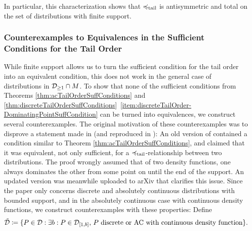 \documentclass[a4paper,DIV=11,abstracton,twoside=semi]{scrreprt}
\newcommand{\M}{M}
\theoremstyle{definition}
\begin{document}
    In particular, this characterization shows that $\preccurlyeq_{\text{tail}}$ is antisymmetric and total on the set of distributions with finite support.
    
    \subsubsection{Counterexamples to Equivalences in the Sufficient Conditions for the Tail Order}
    \newcommand{\DRass}{\tilde{\DP}}
    While finite support allows us to turn the sufficient condition for the tail order into an equivalent condition, this does not work in the general case of distributions in $\Dgeqone \cap \M$.
    To show that none of the sufficient conditions from Theorems \ref{thm:acTailOrderSuffConditions} and \ref{thm:discreteTailOrderSuffConditions}\, \ref{item:discreteTailOrder-DominatingPointSuffCondition} can be turned into equivalences, we construct several counterexamples.
    The original motivation of these counterexamples was to disprove a statement made in \cite{bib:rassGameRiskManagI} (and reproduced in \cite{bib:rassTotalOrderingOnLossDistributions}): 
    An old version of \cite{bib:rassGameRiskManagI} contained a condition similar to Theorem \ref{thm:acTailOrderSuffConditions}, and claimed that it was equivalent, not only sufficient, for a $\preccurlyeq_{\text{tail}}$-relationship between two distributions. The proof wrongly assumed that of two density functions, one always dominates the other from some point on until the end of the support.
    An updated version was meanwhile uploaded to arXiv that clarifies this issue. Since the paper only concerns discrete and absolutely continuous distributions with bounded support, and in the absolutely continuous case with continuous density functions, we construct counterexamples with these properties: Define 
    \begin{gather*}
        \DRass \coloneqq \set{P \in \DP: \text{$\exists b: P \in \DP_{[1, b]}$, $P$ discrete or AC with continuous density function}}.
    \end{gather*}
    
\end{document}
